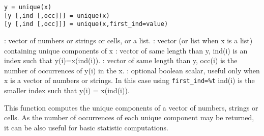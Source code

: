 
\begin{mandesc}
\end{mandesc}

\begin{calling_sequence}
\begin{verbatim}
y = unique(x)
[y [,ind [,occ]]] = unique(x)
[y [,ind [,occ]]] = unique(x,first_ind=value)
\end{verbatim}
\end{calling_sequence}
\begin{parameters}
  \begin{varlist}
    : vector of numbers or strings or cells, or a list.
    : vector (or list when x is a list) containing unique components of x
    : vector of same length than y, ind(i) is an index
                  such that y(i)=x(ind(i)).
    : vector of same length than y, occ(i) is the number
                  of occurrences of y(i) in the x.
    : optional boolean scalar, useful only when x is a vector
    of numbers or strings. In this case using \verb!first_ind=%t! ind(i) is
    the smaller index such that y(i) = x(ind(i)).
  \end{varlist}
\end{parameters}

\begin{mandescription}
  This function computes the unique components of a vector of numbers,
  strings or cells. As the number of occurrences of each unique
  component may be returned, it can be also useful for basic statistic
  computations.
\end{mandescription}

